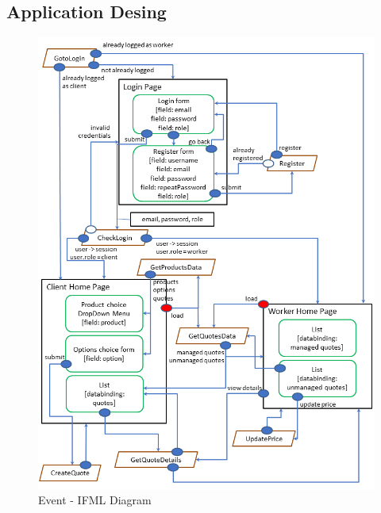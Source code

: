 \documentclass[a4paper, 12pt]{article}
\begin{document}
\subsection{Application Desing}
\begin{figure}[h!]
	\centering
	\includegraphics[width=1\textwidth]{RIA_images/ifmlRIA.png}
	\caption{Event - IFML Diagram}
	\label{figure:ifmlRIA}
\end{figure}
\end{document}
